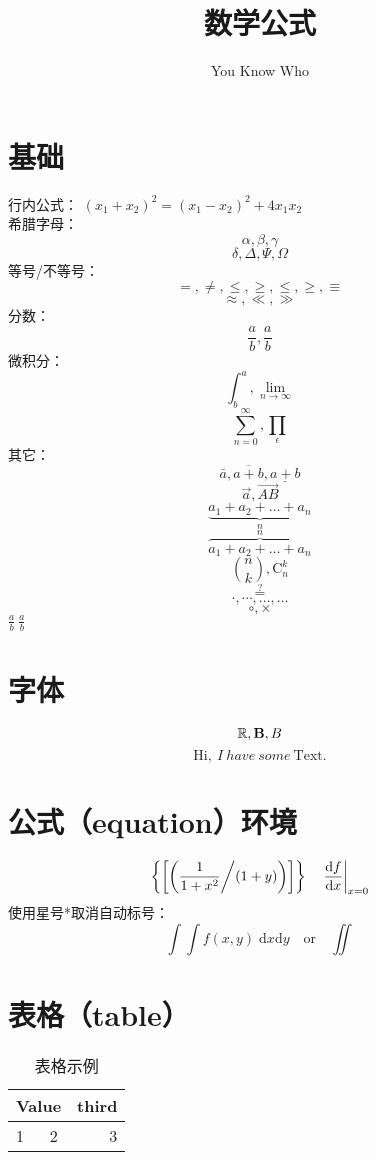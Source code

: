 \documentclass[12pt]{article}
\author{You Know Who}
\title{数学公式}
\begin{document}
\maketitle
\tableofcontents
\listoftables

\section{基础}
行内公式：
$ (x_1 + x_2)^2 = (x_1 - x_2)^2 + 4 x_1 x_2 $ \\
希腊字母：
\begin{equation*}
	\alpha, \beta, \gamma
\end{equation*}
\begin{displaymath}
	\delta, \Delta, \Psi, \Omega
\end{displaymath}
等号/不等号：
\[ =, \neq, \leq, \geq, \leqslant, \geqslant, \equiv \]
\[ \approx, \ll, \gg \]
分数：
\[ \frac{a}{b}, \frac ab \]
微积分：
\[ \int^a_b, \lim_{n \rightarrow \infty} \]
\[ \sum_{n=0}^{\infty}, \prod_\epsilon \]
其它：
\[ \bar{a}, \overline{a+b}, \underline{a+b} \]
\[ \vec{a}, \overrightarrow{AB} \]
\[ \underbrace{a_1+a_2+\ldots+a_n}_n \]
\[ \overbrace{a_1+a_2+\ldots+a_n}^n \]
\[ \binom{n}{k}, \mathrm{C}_n^k \]
\[ \stackrel{?}{=} \]
\[ \cdot, \cdots, \dots, \ldots \]
\[ \circ, \times \]
$ \frac ab\ {\displaystyle \frac ab} $
\section{字体}
\[ \mathbb{R}, \mathbf{B}, \boldmath{B} \]
\[ \mathrm{Hi},\ I\ have\ some\ \text{Text}. \]
\section{公式（equation）环境}
\begin{equation}
	\label{eq1}
	\left\{ \left[ \left( \frac{1}{1+x^2} \middle/ (1 + y) \right) \right] \right\}
	\quad \left. \frac{\mathrm{d}f}{\mathrm{d}x} \right|_{x = 0}
\end{equation}
使用星号*取消自动标号：
\begin{equation*}
	\int\!\!\!\int f(x, y) \; \mathrm{d} x \mathrm{d} y
	\quad \text{or} \quad \iint
\end{equation*}
\section{表格（table）}
\begin{table}[htbp]
	\begin{center}
		\begin{tabular}{|l|c|r|}
			\hline
			\multicolumn{2}{|c|}{Value} & third     \\ \hline
			1                           & 2     & 3 \\ \cline{1-1}
		\end{tabular}
		\caption{表格示例}
		\label{tab1}
	\end{center}
\end{table}
\end{document}
